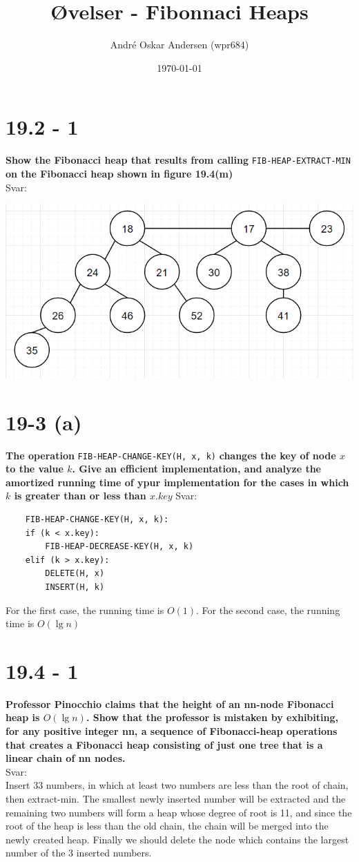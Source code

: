 \documentclass{report}
\title{Øvelser - Fibonnaci Heaps}
\author{André Oskar Andersen (wpr684)}
\date{\today}
\begin{document}
\maketitle

\section*{19.2 - 1}
\textbf{Show the Fibonacci heap that results from calling} \texttt{FIB-HEAP-EXTRACT-MIN} \textbf{on the Fibonacci heap shown in figure 19.4(m)} \\
Svar: \\
\begin{center}
    \includegraphics[width = 7 cm]{../entities/19_2_1.png}
\end{center}

\section*{19-3 (a)}
\textbf{The operation} \texttt{FIB-HEAP-CHANGE-KEY(H, x, k)} \textbf{changes the key of node $x$ to the value $k$. Give an efficient implementation, and analyze the amortized running time of ypur implementation for the cases in which $k$ is greater than or less than $x.key$}
Svar:
\begin{verbatim}
    FIB-HEAP-CHANGE-KEY(H, x, k):
    if (k < x.key):
        FIB-HEAP-DECREASE-KEY(H, x, k)
    elif (k > x.key):
        DELETE(H, x)
        INSERT(H, k)
\end{verbatim}
For the first case, the running time is $O(1)$. For the second case, the running time is $O(\lg n)$

\section*{19.4 - 1}
\textbf{Professor Pinocchio claims that the height of an nn-node Fibonacci heap is $O(\lg n)$. Show that the professor is mistaken by exhibiting, for any positive integer nn, a sequence of Fibonacci-heap operations that creates a Fibonacci heap consisting of just one tree that is a linear chain of nn nodes.} \\
Svar: \\
Insert 33 numbers, in which at least two numbers are less than the root of chain, then extract-min. The smallest newly inserted number will be extracted and the remaining two numbers will form a heap whose degree of root is 11, and since the root of the heap is less than the old chain, the chain will be merged into the newly created heap. Finally we should delete the node which contains the largest number of the 3 inserted numbers.
\end{document}
